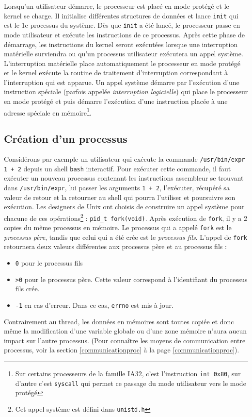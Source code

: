 Lorsqu'un utilisateur démarre, le processeur est placé en mode protégé et le kernel se charge. Il initialise différentes structures de données et lance \texttt{init} qui est le 1e processus du système. Dès que \texttt{init} a été lancé, le processeur passe en mode utilisateur et exécute les instructions de ce processus. Après cette phase de démarrage, les instructions du kernel seront exécutées lorsque une interruption matérielle surviendra ou qu'un processus utilisateur exécutera un appel système. L'interruption matérielle place automatiquement le processeur en mode protégé et le kernel exécute la routine de traitement d'interruption correspondant à l'interruption qui est apparue. Un appel système démarre par l'exécution d'une instruction spéciale (parfois appelée \textit{interruption logicielle}) qui place le processeur en mode protégé et puis démarre l'exécution d'une instruction placée à une adresse spéciale en mémoire\footnote{Sur certains processeurs de la famille IA32, c'est l'instruction \texttt{int 0x80}, sur d'autre c'est \texttt{syscall} qui permet ce passage du mode utilisateur vers le mode protégé}.

\subsection{Création d'un processus}
Considérons par exemple un utilisateur qui exécute la commande \texttt{/usr/bin/expr 1 + 2} depuis un shell \texttt{bash} interactif. Pour exécuter cette commande, il faut exécuter un nouveau processus contenant les instructions assembleur se trouvant dans \texttt{/usr/bin/expr}, lui passer les arguments \texttt{1 + 2}, l'exécuter, récupéré sa valeur de retour et la retourner au shell qui pourra l'utiliser et poursuivre son exécution. Les designers de Unix ont choisis de construire un appel système pour chacune de ces opérations\footnote{Cet appel système est défini dans \texttt{unistd.h}} : \texttt{pid\_t fork(void)}. Après exécution de \texttt{fork}, il y a 2 copies du même processus en mémoire. Le processus qui a appelé \texttt{fork} est le \textit{processus père}, tandis que celui qui a été crée est le \textit{processus fils}. L'appel de \texttt{fork} retournera deux valeurs différentes aux processus père et au processus fils :
\begin{itemize}
  \item \texttt{0} pour le processus fils
  \item \texttt{>0} pour le processus père. Cette valeur correspond à l'identifiant du processus fils crée.
  \item \texttt{-1} en cas d'erreur. Dans ce cas, \texttt{errno} est mis à jour.
\end{itemize}
Contrairement au thread, les données en mémoires sont toutes copiée et donc même la modification d'une variable globale ou d'une zone mémoire n'aura aucun impact sur l'autre processus. (Pour connaître les moyens de communication entre processus, voir la section \ref{communicationproc} à la page \ref{communicationproc}). \\

